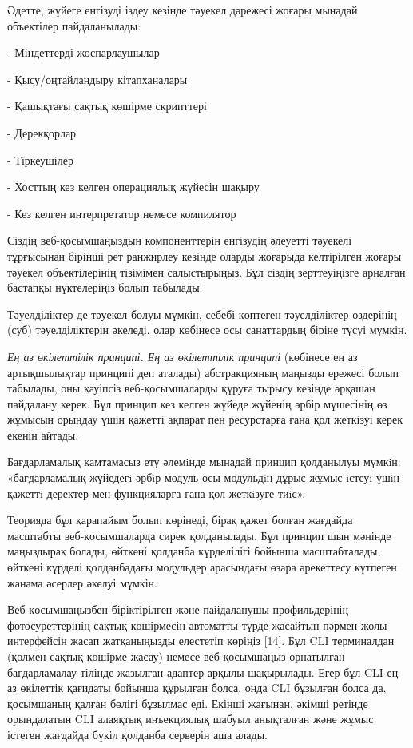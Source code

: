 \begin{multicols}{2}
Әдетте, жүйеге енгізуді іздеу кезінде тәуекел дәрежесі жоғары мынадай
объектілер пайдаланылады:

- Міндеттерді жоспарлаушылар

- Қысу/оңтайландыру кітапханалары

- Қашықтағы сақтық көшірме скрипттері

- Дерекқорлар

- Тіркеушілер

- Хосттың кез келген операциялық жүйесін шақыру

- Кез келген интерпретатор немесе компилятор

Сіздің веб-қосымшаңыздың компоненттерін енгізудің әлеуетті тәуекелі
тұрғысынан бірінші рет ранжирлеу кезінде оларды жоғарыда келтірілген
жоғары тәуекел объектілерінің тізімімен салыстырыңыз. Бұл сіздің
зерттеуіңізге арналған бастапқы нүктелеріңіз болып табылады.

Тәуелділіктер де тәуекел болуы мүмкін, себебі көптеген тәуелділіктер
өздерінің (суб) тәуелділіктерін әкеледі, олар көбінесе осы санаттардың
біріне түсуі мүмкін.

\emph{Ең аз өкілеттілік принципі. Ең аз өкілеттілік принципі} (көбінесе
ең аз артықшылықтар принципі деп аталады) абстракцияның маңызды ережесі
болып табылады, оны қауіпсіз веб-қосымшаларды құруға тырысу кезінде
әрқашан пайдалану керек. Бұл принцип кез келген жүйеде жүйенің әрбір
мүшесінің өз жұмысын орындау үшін қажетті ақпарат пен ресурстарға ғана
қол жеткізуі керек екенін айтады.

Бағдарламалық қамтамасыз ету әлемiнде мынадай принцип қолданылуы мүмкiн:
«бағдарламалық жүйедегi әрбiр модуль осы модульдiң дұрыс жұмыс iстеуi
үшiн қажеттi деректер мен функцияларға ғана қол жеткiзуге тиiс».

Теорияда бұл қарапайым болып көрінеді, бірақ қажет болған жағдайда
масштабты веб-қосымшаларда сирек қолданылады. Бұл принцип шын мәнінде
маңыздырақ болады, өйткені қолданба күрделілігі бойынша масштабталады,
өйткені күрделі қолданбадағы модульдер арасындағы өзара әрекеттесу
күтпеген жанама әсерлер әкелуі мүмкін.

Веб-қосымшаңызбен біріктірілген және пайдаланушы профильдерінің
фотосуреттерінің сақтық көшірмесін автоматты түрде жасайтын пәрмен жолы
интерфейсін жасап жатқаныңызды елестетіп көріңіз {[}14{]}. Бұл CLI
терминалдан (қолмен сақтық көшірме жасау) немесе веб-қосымшаңыз
орнатылған бағдарламалау тілінде жазылған адаптер арқылы шақырылады.
Егер бұл CLI ең аз өкілеттік қағидаты бойынша құрылған болса, онда CLI
бұзылған болса да, қосымшаның қалған бөлігі бұзылмас еді. Екінші
жағынан, әкімші ретінде орындалатын CLI алаяқтық инъекциялық шабуыл
анықталған және жұмыс істеген жағдайда бүкіл қолданба серверін аша
алады.


\end{multicols}

